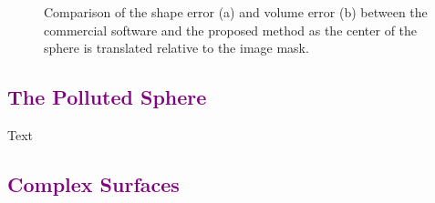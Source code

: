 \begin{figure}[b!]
	\centering
	\caption{Comparison of the shape error (a) and volume error (b) between the commercial software and the proposed method as the center of the sphere is translated relative to the image mask.}
	\label{fig:graph3}
\end{figure}
\subsection{\textcolor{purple}{The Polluted Sphere}}
\label{The Polluted Sphere}

\color{purple}

Text

\color{black}
\subsection{\textcolor{purple}{Complex Surfaces}}
\label{Complex Surfaces}

